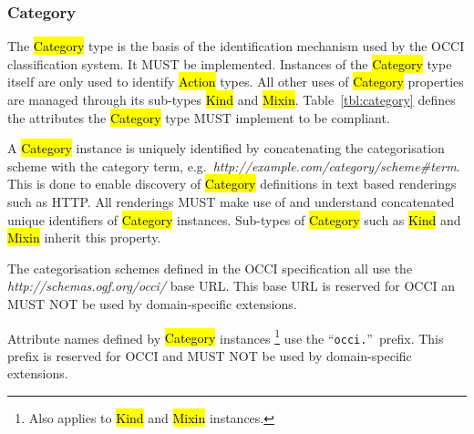 \documentclass[10pt,a4paper,british]{article}
\begin{document}
\subsubsection{Category}
\label{sec:category}
The \hl{Category} type is the basis of the identification mechanism used by the
OCCI classification system. It MUST be implemented. Instances of the
\hl{Category} type itself are only used to identify \hl{Action} types. All
other uses of \hl{Category} properties are managed through its sub-types
\hl{Kind} and \hl{Mixin}.
%
Table~\ref{tbl:category} defines the attributes the \hl{Category} type MUST
implement to be compliant.


A \hl{Category} instance is uniquely identified by concatenating the
categorisation scheme with the category term,
e.g.~\textit{http://example.com/category/scheme\#term}.
This is done to enable discovery of \hl{Category} definitions in text based
renderings such as HTTP. All renderings MUST make use of and understand
concatenated unique identifiers of \hl{Category} instances.
%
Sub-types of \hl{Category} such as \hl{Kind} and \hl{Mixin} inherit this property.

The categorisation schemes defined in the OCCI specification all use the
\textit{http://schemas.ogf.org/occi/} base URL. This base URL is reserved for
OCCI an MUST NOT be used by domain-specific extensions.

Attribute names defined by \hl{Category} instances%
\footnote{Also applies to \hl{Kind} and \hl{Mixin} instances.}
use the ``\texttt{occi.}''~prefix.  This prefix is reserved for OCCI and MUST NOT
be used by domain-specific extensions.
\end{document}
